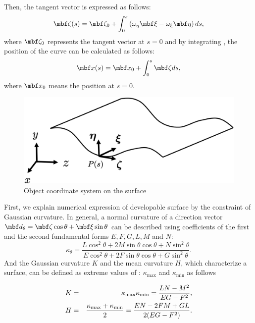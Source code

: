 \documentclass[E]{scitrans}
\begin{document}
Then, the tangent vector is expressed as follows: 
\begin{equation}
\zetavec(s) = \zetavec_0 + \int_{0}^{s} \left( \omega_{\eta} \xivec - \omega_{\xi} \etavec \right) ds,
\label{eq:zetav_eq}
\end{equation}
where $\zetavec_0$ represents the tangent vector at $s=0$ and by integrating , the position of the curve can be calculated as follows:
\begin{equation}
\mbold{x}(s) = \mbold{x}_0 + \int_0^s \zetavec ds, 
\end{equation}
where $\mbold{x}_0$ means the position at $s=0$. 

\begin{figure}[thpb]
	\centering
	\includegraphics[width = 0.8\columnwidth]{./figure/Object_Coordinates.eps}
	\caption{Object coordinate system on the surface}
	\label{fig:obj_coord}
\end{figure}

First, we explain numerical expression of developable surface by the constraint of Gaussian curvature. 
In general, a normal curvature of a direction vector $\mbold{d}_{\theta} = \zetavec \cos \theta + \xivec \sin \theta $ can be described using coefficients of the first and the second fundamental forms $E, F, G, L, M$ and $N$:
\begin{equation}\label{eq:def_kappa_theta}
\kappa_{\theta} = \frac{L \cos^2 \theta + 2M \sin \theta \cos \theta + N \sin^2 \theta}{E \cos^2 \theta + 2F \sin \theta \cos \theta + G \sin^2 \theta}.
\end{equation}
And the Gaussian curvature $K$ and the mean curvature $H$, which characterize a surface, can be defined as extreme values of : $ \kappa_{\max} $ and $ \kappa_{\min} $ as follows

\begin{eqnarray}
K &=& \kappa_{\max}  \kappa_{\min}  = {\displaystyle{\frac{LN-M^2}{EG-F^2}}}, \nonumber \\ 
H &=& {\displaystyle{\frac{\kappa_{\max} + \kappa_{\min}}{2}}} = \frac{EN-2FM+GL}{2(EG-F^2)}. 
\end{eqnarray}
\end{document}
